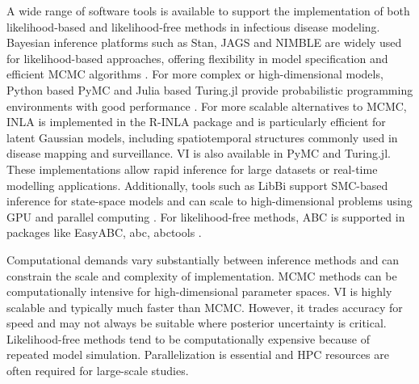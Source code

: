 \documentclass{article}
\begin{document}
A wide range of software tools is available to support the implementation of both likelihood-based and likelihood-free methods in infectious disease modeling. Bayesian inference platforms such as Stan, JAGS and NIMBLE are widely used for likelihood-based approaches, offering flexibility in model specification and efficient MCMC algorithms \citep{carpenter2017stan,abril2023pymc}. For more complex or high-dimensional models, Python based PyMC and Julia based Turing.jl provide probabilistic programming environments with good performance \citep{abril2023pymc,ge2018turing,fjelde2025turing}. For more scalable alternatives to MCMC, INLA is implemented in the R-INLA package \citep{martins2013bayesian} and is particularly efficient for latent Gaussian models, including spatiotemporal structures commonly used in disease mapping and surveillance. VI is also available in PyMC and Turing.jl. These implementations allow rapid inference for large datasets or real-time modelling applications.  Additionally, tools such as LibBi support SMC-based inference for state-space models and can scale to high-dimensional problems using GPU and parallel computing \citep{murray2015bayesian}. For likelihood-free methods, ABC is supported in packages like EasyABC, abc, abctools \citep{jabot2013easy,csillery2012abc,nunes2015abctools}.

Computational demands vary substantially between inference methods and can constrain the scale and complexity of implementation. MCMC methods can be computationally intensive for high-dimensional parameter spaces. VI is highly scalable and typically much faster than MCMC. However, it trades accuracy for speed and may not always be suitable where posterior uncertainty is critical. Likelihood-free methods tend to be computationally expensive because of repeated model simulation. Parallelization is essential and HPC resources are often required for large-scale studies. 

\end{document}

